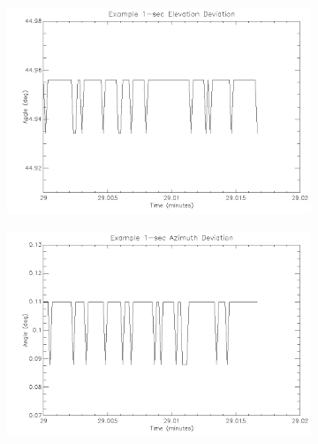 \newpage
\begin{figure}[htbp]
\captionsetup[subfigure]{justification=centering}
\captionsetup{justification=centering}
    \centering
	\begin{subfigure}{0.45\textwidth}
		\includegraphics[width=1\linewidth]{appendix/img/campaign_results/earlyalt1sec.png}
		\caption{}
		\label{fig:sub:earlyalt1}
	\end{subfigure}
	\begin{subfigure}{0.45\textwidth}
		\includegraphics[width=1\linewidth]{appendix/img/campaign_results/earlyaz1sec.png}
		\caption{}
		\label{fig:sub:earlyaz1}
	\end{subfigure}
	\begin{subfigure}{0.45\textwidth}

\end{subfigure}
\end{figure}
